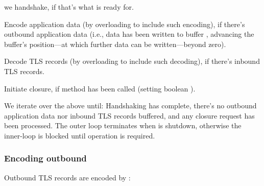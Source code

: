 \noindent
we handshake, if that's what  is ready for.



\noindent
Encode application data (by overloading  to include
such encoding), if there's outbound application data (i.e., data has been written 
to buffer , advancing the buffer's position---at which further 
data can be written---beyond zero).



\noindent
Decode TLS records (by overloading  to include
such decoding), if there's inbound TLS records.



\noindent
Initiate closure, if method  has been called (setting boolean 
).



\noindent
We iterate over the above until: Handshaking has complete, there's no 
outbound application data nor inbound TLS records buffered, and any closure request 
has been processed. The outer loop terminates when  is shutdown, 
otherwise the inner-loop is blocked until operation is required.




\subsubsection*{Encoding outbound}

Outbound TLS records are encoded by :



